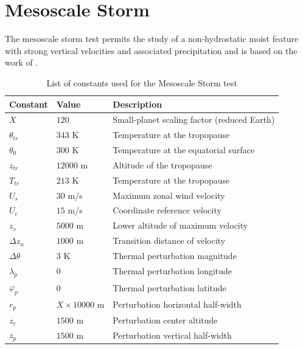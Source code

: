 \documentclass[times,doublespace]{fldauth}
\begin{document}
{\clearpage

\section{Mesoscale Storm}  \label{sec:mesoscale_storm}

The mesoscale storm test permits the study of a non-hydrostatic moist feature with strong vertical velocities and associated precipitation and is based on the work of \cite{klemp1978simulation}.

\begin{table}[h]

\caption{List of constants used for the Mesoscale Storm test}

\begin{tabular*}{\textwidth}{@{\extracolsep{\fill}}lll}
\hline Constant & Value & Description \\
\hline
$X$ & $120$ & Small-planet scaling factor (reduced Earth)\\
$\theta_{tr}$ & $343$ K & Temperature at the tropopause \\
$\theta_0$ & $300$ K & Temperature at the equatorial surface \\
$z_{tr}$ & $12000$ m & Altitude of the tropopause \\
$T_{tr}$ & $213$ K & Temperature at the tropopause \\
$U_s$ & $30$ m/s & Maximum zonal wind velocity \\
$U_c$ & $15$ m/s & Coordinate reference velocity \\
$z_{s}$ & $5000$ m & Lower altitude of maximum velocity \\
$\Delta z_{u}$ & $1000$ m & Transition distance of velocity \\
$\Delta \theta$ & $3$ K & Thermal perturbation magnitude \\
$\lambda_p$ & $0$ & Thermal perturbation longitude \\
$\varphi_p$ & $0$ & Thermal perturbation latitude \\
$r_p$ & $X \times 10000$ m & Perturbation horizontal half-width \\
$z_{c}$ & $1500$ m & Perturbation center altitude \\
$z_{p}$ & $1500$ m & Perturbation vertical half-width \\
\hline 
\end{tabular*}

\end{table}

}
\end{document}
